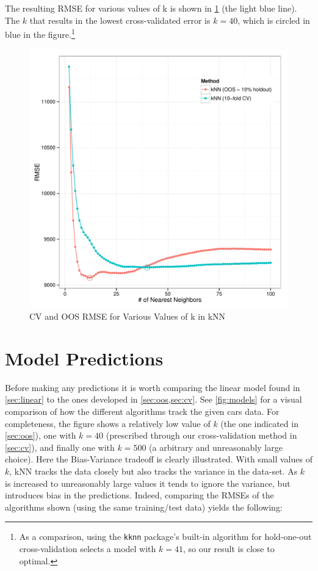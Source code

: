 \documentclass[11pt, fleqn, titlepage]{article}
\begin{document}
The resulting RMSE for various values of k is shown in \cref{fig:sweep} (the light blue line). The \(k\) that results in the lowest cross-validated error is \(k=40\), which is circled in blue in the figure.\footnote{As a comparison, using the \texttt{kknn} package's built-in algorithm for hold-one-out cross-validation selects a model with \(k=41\), so our result is close to optimal.}

\begin{figure}[!htb]
  \centering
  \includegraphics[scale=.5]{sweep_kknn.pdf}
  \caption{CV and OOS RMSE for Various Values of k in kNN}
  \label{fig:sweep}
\end{figure}

\section{Model Predictions}
Before making any predictions it is worth comparing the linear model found in \cref{sec:linear} to the ones developed in \cref{sec:oos,sec:cv}.  See \cref{fig:models} for a visual comparison of how the different algorithms track the given cars data.  For completeness, the figure shows a relatively low value of $k$ (the one indicated in \cref{sec:oos}), one with $k=40$ (prescribed through our cross-validation method in \cref{sec:cv}), and finally one with $k=500$ (a arbitrary and unreasonably large choice).  Here the Bias-Variance tradeoff is clearly illustrated.  With small values of $k$, kNN tracks the data closely but also tracks the variance in the data-set.  As $k$ is increased to unreasonably large values it tends to ignore the variance, but introduces bias in the predictions.  Indeed, comparing the RMSEs of the algorithms shown (using the same training/test data) yields the following:
\end{document}
